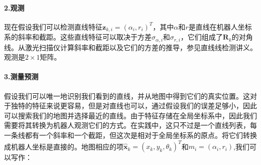 
\paragraph{2.观测}
现在假设我们可以检测直线特征$\boldsymbol{z}_{k,i}=(\alpha_i,r_i)^T$，其中$\alpha$和$r$是直线在机器人坐标系的斜率和截距。这些直线特征可以取决于方差$\sigma_{\alpha,i}$和$\sigma_{r,i}$，它们组成了$\boldsymbol{R}_{k}$的对角线。从激光扫描仪计算斜率和截距以及它们的方差的推导，参见直线线检测讲义。观测是$2\times 1$矩阵。


\paragraph{3.测量预测}
假设我们可以唯一地识别我们看到的直线，并从地图中得到它们的真实位置。这对于独特的特征来说更容易，但是对直线也可以，通过假设我们的误差足够小，因此可以搜索我们的地图并选择最近的直线。由于特征存储在全局坐标系中，因此我们需要将其转换为机器人观测它们的方式。在实践中，这只不过是一个直线列表，每一条线都有一个斜率和一个截距，但这次是相对于全局坐标系的原点。将它们转换成机器人坐标是直接的。地图相应的项$\hat{\boldsymbol{x}}_{k}=(x_{k},y_{k},\theta_k)^T$和$m_i=(\alpha_i,r_i)$,我们可以写作：

